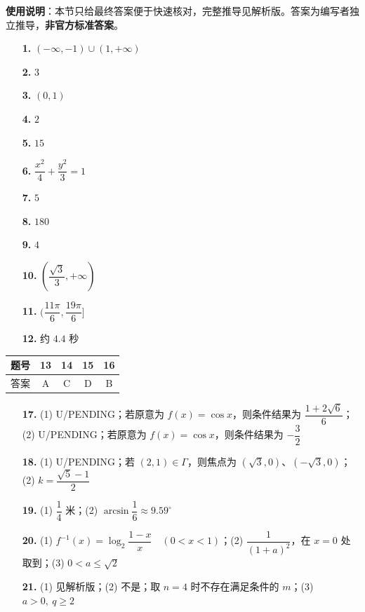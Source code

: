 
\begin{gknotice}
\textbf{使用说明}：本节只给最终答案便于快速核对，完整推导见解析版。答案为编写者独立推导，\textbf{非官方标准答案}。
\end{gknotice}

\begin{itemize}[leftmargin=2.6em]
  \item[\textbf{1.}] $(-\infty,-1)\cup(1,+\infty)$
  \item[\textbf{2.}] $3$
  \item[\textbf{3.}] $(0,1)$
  \item[\textbf{4.}] $2$
  \item[\textbf{5.}] $15$
  \item[\textbf{6.}] $\dfrac{x^2}{4}+\dfrac{y^2}{3}=1$
  \item[\textbf{7.}] $5$
  \item[\textbf{8.}] $180$
  \item[\textbf{9.}] $4$
  \item[\textbf{10.}] $(\dfrac{\sqrt3}{3},+\infty)$
  \item[\textbf{11.}] $(\dfrac{11\pi}{6},\dfrac{19\pi}{6}]$
  \item[\textbf{12.}] 约 $4.4$ 秒
\end{itemize}

\begin{center}\begin{tabular}{ccccc}
\toprule
题号 & 13 & 14 & 15 & 16 \\
\midrule
答案 & A & C & D & B \\
\bottomrule
\end{tabular}\end{center}

\begin{itemize}[leftmargin=2.6em]
  \item[\textbf{17.}] (1) U/PENDING；若原意为 $f(x)=\cos x$，则条件结果为 $\dfrac{1+2\sqrt6}{6}$；(2) U/PENDING；若原意为 $f(x)=\cos x$，则条件结果为 $-\dfrac32$
  \item[\textbf{18.}] (1) U/PENDING；若 $(2,1)\in\Gamma$，则焦点为 $(\sqrt3,0)$、$(-\sqrt3,0)$；(2) $k=\dfrac{\sqrt5-1}{2}$
  \item[\textbf{19.}] (1) $\dfrac14$ 米；(2) $\arcsin\dfrac16\approx9.59^\circ$
  \item[\textbf{20.}] (1) $f^{-1}(x)=\log_2\dfrac{1-x}{x}\quad(0<x<1)$；(2) $\dfrac{1}{(1+a)^2}$，在 $x=0$ 处取到；(3) $0<a\leq\sqrt2$
  \item[\textbf{21.}] (1) 见解析版；(2) 不是；取 $n=4$ 时不存在满足条件的 $m$；(3) $a>0,\ q\geq2$
\end{itemize}
